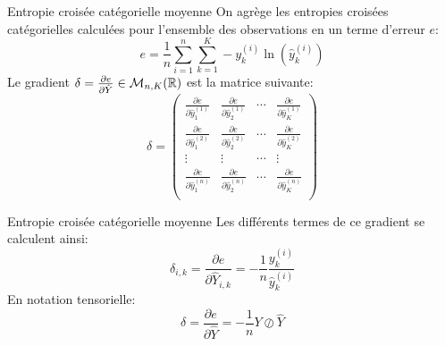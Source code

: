 \begin{frame}{Entropie croisée catégorielle moyenne}
	On agrège les entropies croisées catégorielles calculées pour l'ensemble des observations en un terme d'erreur $e$:
	\begin{equation*}
		e = \frac{1}{n} \sum_{i=1}^n \sum_{k=1}^K - y_k^{(i)} \ln{\left(\hat{y}_k^{(i)}\right)}
	\end{equation*}
	\pause
	Le gradient $\delta = \frac{\partial{e}}{\partial{\hat{Y}}} \in \mathcal{M}_{n,K}(\mathbb{R})$ est la matrice suivante:
	\begin{equation*}
		\delta 
		= 
		\begin{pmatrix}
			\frac{\partial{e}}{\partial{\hat{y}_1^{(1)}}} & \frac{\partial{e}}{\partial{\hat{y}_2^{(1)}}} & \cdots & \frac{\partial{e}}{\partial{\hat{y}_K^{(1)}}} \\[5pt]
			\frac{\partial{e}}{\partial{\hat{y}_1^{(2)}}} & \frac{\partial{e}}{\partial{\hat{y}_2^{(2)}}} & \cdots & \frac{\partial{e}}{\partial{\hat{y}_K^{(2)}}}\\[5pt]
			\vdots & \vdots & \cdots & \vdots \\
			\frac{\partial{e}}{\partial{\hat{y}_1^{(n)}}} & \frac{\partial{e}}{\partial{\hat{y}_2^{(n)}}} & \cdots & 
			\frac{\partial{e}}{\partial{\hat{y}_K^{(n)}}}\\[5pt]
		\end{pmatrix}
	\end{equation*}
\end{frame}

\begin{frame}{Entropie croisée catégorielle moyenne}
	Les différents termes de ce gradient se calculent ainsi:
	\begin{equation*}
		\delta_{i,k} = \frac{\partial{e}}{\partial{\hat{Y}_{i,k}}} = - \frac{1}{n} \frac{y_k^{(i)}}{\hat{y}_k^{(i)}}
	\end{equation*}
	\pause
	En notation tensorielle:
	\begin{equation*}
		\delta = \frac{\partial{e}}{\partial{\hat{Y}}} = - \frac{1}{n} Y \oslash \hat{Y}
	\end{equation*}	
\end{frame}


